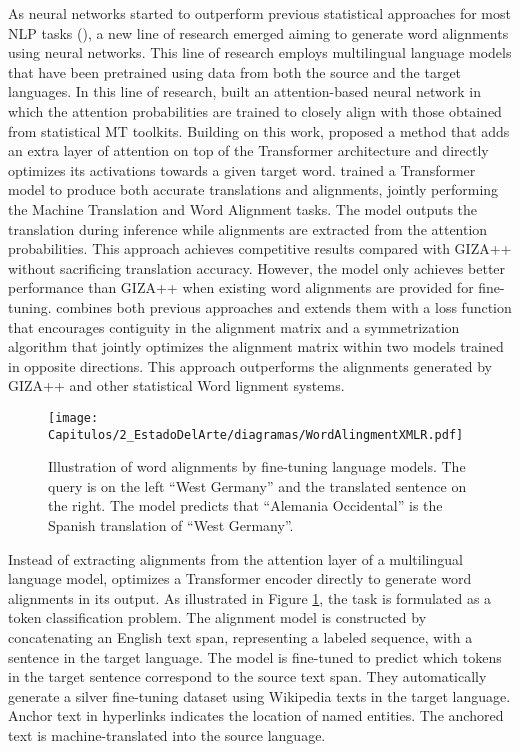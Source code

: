 As neural networks started to outperform previous statistical approaches for most NLP tasks (\cite{DBLP:journals/csur/MinRSVNSAHR24}), a new line of research emerged aiming to generate word alignments using neural networks. This line of research employs multilingual language models that have been pretrained using data from both the source and the target languages. In this line of research, \cite{DBLP:journals/pbml/PeterNN17} built an attention-based neural network in which the attention probabilities are trained to closely align with those obtained from statistical MT toolkits. Building on this work, \cite{DBLP:journals/corr/abs-1901-11359} proposed a method that adds an extra layer of attention on top of the Transformer architecture and directly optimizes its activations towards a given target word.
\cite{garg-etal-2019-jointly} trained a Transformer model to produce both accurate translations and alignments, jointly performing the Machine Translation and Word Alignment tasks. The model outputs the translation during inference while alignments are extracted from the attention probabilities. This approach achieves competitive results compared with GIZA++ without sacrificing translation accuracy. 
However, the model only achieves better performance than GIZA++ when existing word alignments are provided for fine-tuning. 
\cite{DBLP:conf/acl/ZenkelWD20} combines both previous approaches and extends them with a loss function that encourages contiguity in the alignment matrix and a symmetrization algorithm that jointly optimizes the alignment matrix within two models trained in opposite directions. This approach outperforms the alignments generated by GIZA++ and other statistical Word lignment systems. 



\begin{figure}
    \centering
    \texttt{[image: Capitulos/2\_EstadoDelArte/diagramas/WordAlingmentXMLR.pdf]}
    \caption{Illustration of word alignments by fine-tuning language models. The query is on the left ``West Germany'' and the translated sentence on the right. The model predicts that ``Alemania Occidental'' is the Spanish translation of ``West Germany''.}
    \label{fig:chap3_wordalignmentsXLMR}
\end{figure}

Instead of extracting alignments from the attention layer of a multilingual language model, \cite{Li2021CrossLingualNE} optimizes a Transformer encoder directly to generate word alignments in its output. As illustrated in Figure \ref{fig:chap3_wordalignmentsXLMR}, the task is formulated as a token classification problem. The alignment model is constructed by concatenating an English text span, representing a labeled sequence, with a sentence in the target language. The model is fine-tuned to predict which tokens in the target sentence correspond to the source text span. They automatically generate a silver fine-tuning dataset using Wikipedia texts in the target language. Anchor text in hyperlinks indicates the location of named entities. The anchored text is machine-translated into the source language. 

